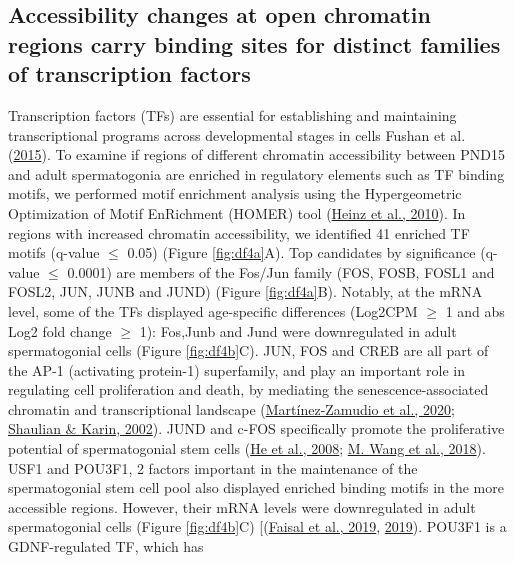 \documentclass[12pt,twoside]{reedthesis}
\begin{document}
\hypertarget{accessibility-changes-at-open-chromatin-regions-carry-binding-sites-for-distinct-families-of-transcription-factors}{%
\subsection{Accessibility changes at open chromatin regions carry binding sites for distinct families of transcription factors}\label{accessibility-changes-at-open-chromatin-regions-carry-binding-sites-for-distinct-families-of-transcription-factors}}

Transcription factors (TFs) are essential for establishing and
maintaining transcriptional programs across developmental stages in
cells Fushan et al. (\protect\hyperlink{ref-fushan2015}{2015}). To examine if regions of different
chromatin accessibility between PND15 and adult spermatogonia are
enriched in regulatory elements such as TF binding motifs, we performed
motif enrichment analysis using the Hypergeometric Optimization of Motif
EnRichment (HOMER) tool (\protect\hyperlink{ref-heinz2010}{Heinz et al., 2010}). In regions with increased
chromatin accessibility, we identified 41 enriched TF motifs (q-value
\(\leq\) 0.05) (Figure \ref{fig:df4a}A). Top candidates by significance (q-value \(\leq\)
0.0001) are members of the Fos/Jun family (FOS, FOSB, FOSL1 and FOSL2,
JUN, JUNB and JUND) (Figure \ref{fig:df4a}B). Notably, at the mRNA level, some of the
TFs displayed age-specific differences (Log2CPM \(\geq\) 1 and abs Log2
fold change \(\geq\) 1): Fos,Junb and Jund were downregulated in adult
spermatogonial cells (Figure \ref{fig:df4b}C). JUN, FOS and CREB are all part of the
AP-1 (activating protein-1) superfamily, and play an important role in
regulating cell proliferation and death, by mediating the
senescence-associated chromatin and transcriptional landscape
(\protect\hyperlink{ref-martuxednez-zamudio2020}{Martínez-Zamudio et al., 2020}; \protect\hyperlink{ref-shaulian2002}{Shaulian \& Karin, 2002}). JUND and c-FOS specifically
promote the proliferative potential of spermatogonial stem cells
(\protect\hyperlink{ref-he2008}{He et al., 2008}; \protect\hyperlink{ref-wang2018}{M. Wang et al., 2018}). USF1 and POU3F1, 2 factors important in the
maintenance of the spermatogonial stem cell pool also displayed enriched
binding motifs in the more accessible regions. However, their mRNA
levels were downregulated in adult spermatogonial cells (Figure \ref{fig:df4b}C)
{[}(\protect\hyperlink{ref-faisal2019}{Faisal et al., 2019}, \protect\hyperlink{ref-faisal2019}{2019}). POU3F1 is a GDNF-regulated TF, which has
\end{document}
